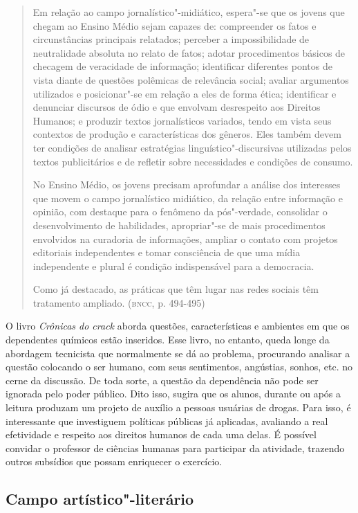 \documentclass{article}
\begin{document}
\begin{quote}
Em relação ao campo jornalístico"-midiático, espera"-se que os jovens
que chegam ao Ensino Médio sejam capazes de: compreender os fatos e
circunstâncias principais relatados; perceber a impossibilidade de
neutralidade absoluta no relato de fatos; adotar procedimentos básicos
de checagem de veracidade de informação; identificar diferentes pontos
de vista diante de questões polêmicas de relevância social; avaliar
argumentos utilizados e posicionar"-se em relação a eles de forma ética;
identificar e denunciar discursos de ódio e que envolvam desrespeito aos
Direitos Humanos; e produzir textos jornalísticos variados, tendo em
vista seus contextos de produção e características dos gêneros. Eles
também devem ter condições de analisar estratégias
linguístico"-discursivas utilizadas pelos textos publicitários e de
refletir sobre necessidades e condições de consumo.

No Ensino Médio, os jovens precisam aprofundar a análise dos interesses
que movem o campo jornalístico midiático, da relação entre informação e
opinião, com destaque para o fenômeno da pós"-verdade, consolidar o
desenvolvimento de habilidades, apropriar"-se de mais procedimentos
envolvidos na curadoria de informações, ampliar o contato com projetos
editoriais independentes e tomar consciência de que uma mídia
independente e plural é condição indispensável para a democracia.

Como já destacado, as práticas que têm lugar nas redes sociais têm
tratamento ampliado. (\textsc{bncc}, p. 494-495)
\end{quote}

O livro \emph{Crônicas do crack} aborda questões, características e
ambientes em que os dependentes químicos estão inseridos. Esse livro,
no entanto, queda longe da abordagem tecnicista que normalmente se dá
ao problema, procurando analisar a questão colocando o ser humano, com
seus sentimentos, angústias, sonhos, etc. no cerne da discussão. De
toda sorte, a questão da dependência não pode ser ignorada pelo poder
público. Dito isso, sugira que os alunos, durante ou após a leitura
produzam um projeto de auxílio a pessoas usuárias de drogas. Para
isso, é interessante que investiguem políticas públicas já aplicadas,
avaliando a real efetividade e respeito aos direitos humanos de cada
uma delas. É possível convidar o professor de ciências humanas para
participar da atividade, trazendo outros subsídios que possam
enriquecer o exercício.

\subsection{Campo artístico"-literário}
\end{document}
